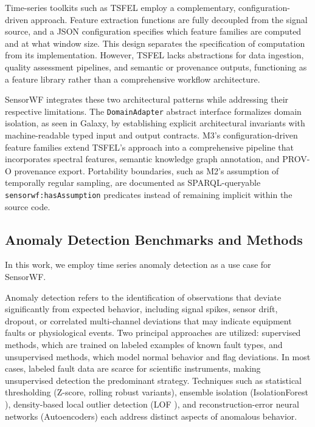 \documentclass[conference]{IEEEtran}
\newcommand\Logan[1]{\leavevmode{\footnotesize\textbf{\hl{[Logan: #1]}}}}
\newcommand\Alex[1]{\leavevmode{\footnotesize\textbf{\hl{[Alex: #1]}}}}
\begin{document}
Time-series toolkits such as TSFEL \cite{barandas2020tsfel} employ a complementary, configuration-driven approach. Feature extraction functions are fully decoupled from the signal source, and a JSON configuration specifies which feature families are computed and at what window size. This design separates the specification of computation from its implementation. However, TSFEL lacks abstractions for data ingestion, quality assessment pipelines, and semantic or provenance outputs, functioning as a feature library rather than a comprehensive workflow architecture.

SensorWF integrates these two architectural patterns while addressing their respective limitations. The \texttt{DomainAdapter} abstract interface formalizes domain isolation, as seen in Galaxy, by establishing explicit architectural invariants with machine-readable typed input and output contracts. M3's configuration-driven feature families extend TSFEL's approach into a comprehensive pipeline that incorporates spectral features, semantic knowledge graph annotation, and PROV-O provenance export. Portability boundaries, such as M2's assumption of temporally regular sampling, are documented as SPARQL-queryable \texttt{sensorwf:hasAssumption} predicates instead of remaining implicit within the source code.




\subsection{Anomaly Detection Benchmarks and Methods}

In this work, we employ time series anomaly detection as a use case for SensorWF. 

Anomaly detection refers to the identification of observations that deviate significantly from expected behavior, including signal spikes, sensor drift, dropout, or correlated multi-channel deviations that may indicate equipment faults or physiological events. Two principal approaches are utilized: supervised methods, which are trained on labeled examples of known fault types, and unsupervised methods, which model normal behavior and flag deviations. In most cases, labeled fault data are scarce for scientific instruments, making unsupervised detection the predominant strategy. Techniques such as statistical thresholding (Z-score, rolling robust variants), ensemble isolation (IsolationForest \cite{liu2008isolation}), density-based local outlier detection (LOF \cite{breunig2000lof}), and reconstruction-error neural networks (Autoencoders) each address distinct aspects of anomalous behavior.
\end{document}
